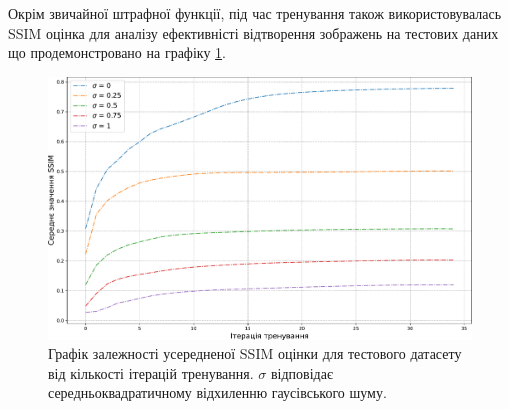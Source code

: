 \documentclass[14pt,a4paper]{extarticle}
\newcounter{e}
\numberwithin{equation}{section}
\numberwithin{figure}{section}
\begin{document}
	Окрім звичайної штрафної функції, під час тренування також використовувалась SSIM оцінка для аналізу ефективністі відтворення зображень на тестових даних що продемонстровано на графіку \ref{fig:awgn-train-ssim-comparation}.
	
	\begin{figure}[H]
		\centering
		\includegraphics[width=1\textwidth]{resources/awgn-train-ssim-comparation.pdf}
		\caption{Графік залежності усередненої SSIM оцінки для тестового датасету від кількості ітерацій тренування. $\sigma$ відповідає середньоквадратичному відхиленню гаусівського шуму.}
		\label{fig:awgn-train-ssim-comparation}
	\end{figure}
	
\end{document}
